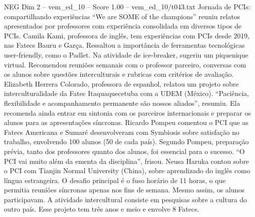 \begin{textsample}{NEG Dim 2 – vem\_ed\_10 – Score 1.00 – vem\_ed\_10/t043.txt}  \label{ex:f2_neg_034}
Jornada de PCIs: compartilhando experiências “We are SOME of the champions” reuniu relatos apresentados por professores com experiência consolidada em diversos tipos de PCIs.
Camila Kami, professora de inglês, tem experiências com PCIs desde 2019, nas Fatecs Bauru e Garça.
Ressaltou a importância de ferramentas tecnológicas user-friendly, como o Padlet.
Na atividade de ice-breaker, sugeriu um piquenique virtual.
Recomendou reuniões semanais com o professor parceiro, conversas com os alunos sobre questões interculturais e rubricas com critérios de avaliação.
Elizabeth Herrera Colorado, professora de espanhol, relatou um projeto sobre interculturalidade da Fatec Itaquaquecetuba com a UDEM (México). “Paciência, flexibilidade e acompanhamento permanente são nossos aliados”, resumiu.
Ela recomenda ainda entrar em sintonia com os parceiros internacionais e preparar os alunos para as apresentações síncronas.
Ricardo Pompeu comentou o PCI que as Fatecs Americana e Sumaré desenvolveram com Symbiosis sobre satisfação no trabalho, envolvendo 100 alunos (50 de cada país).
Segundo Pompeu, preparação prévia, tanto dos professores quanto dos alunos, foi essencial para o sucesso. “O PCI vai muito além da ementa da disciplina”, frisou.
Neusa Haruka contou sobre o PCI com Tianjin Normal University (China), sobre aprendizado do inglês como língua estrangeira.
O desafio principal é o fuso horário de 11 horas, o que permitia reuniões síncronas apenas nos fins de semana.
Mesmo assim, os alunos participavam.
A atividade intercultural consiste em pesquisas sobre a cultura do outro país.
Esse projeto tem três anos e meio e envolve 8 Fatecs.

\end{textsample}

